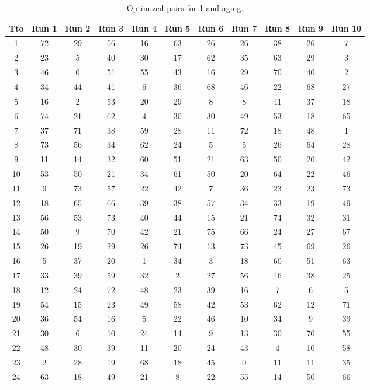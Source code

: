 \begin{table}
  \centering
  \scriptsize
  \caption{Optimized pairs for 1 and aging.}
  \label{tab_pairs}
\begin{tabular}{c c c c c c c c c c c }
\hline
Tto & Run 1 & Run 2 & Run 3 & Run 4 & Run 5 & Run 6 & Run 7 & Run 8 & Run 9 & Run 10 \\
\hline
1 & 72 & 29 & 56 & 16 & 63 & 26 & 26 & 38 & 26 & 7 \\
2 & 23 & 5 & 40 & 30 & 17 & 62 & 35 & 63 & 29 & 3 \\
3 & 46 & 0 & 51 & 55 & 43 & 16 & 29 & 70 & 40 & 2 \\
4 & 34 & 44 & 41 & 6 & 36 & 68 & 46 & 22 & 68 & 27 \\
5 & 16 & 2 & 53 & 20 & 29 & 8 & 8 & 41 & 37 & 18 \\
6 & 74 & 21 & 62 & 4 & 30 & 30 & 49 & 53 & 18 & 65 \\
7 & 37 & 71 & 38 & 59 & 28 & 11 & 72 & 18 & 48 & 1 \\
8 & 73 & 56 & 34 & 62 & 24 & 5 & 5 & 26 & 64 & 28 \\
9 & 11 & 14 & 32 & 60 & 51 & 21 & 63 & 50 & 20 & 42 \\
10 & 53 & 50 & 21 & 34 & 61 & 50 & 20 & 64 & 22 & 46 \\
11 & 9 & 73 & 57 & 22 & 42 & 7 & 36 & 23 & 23 & 73 \\
12 & 18 & 65 & 66 & 39 & 38 & 57 & 34 & 33 & 19 & 49 \\
13 & 56 & 53 & 73 & 40 & 44 & 15 & 21 & 74 & 32 & 31 \\
14 & 50 & 9 & 70 & 42 & 21 & 75 & 66 & 24 & 27 & 67 \\
15 & 26 & 19 & 29 & 26 & 74 & 13 & 73 & 45 & 69 & 26 \\
16 & 5 & 37 & 20 & 1 & 34 & 3 & 18 & 60 & 51 & 63 \\
17 & 33 & 39 & 59 & 32 & 2 & 27 & 56 & 46 & 38 & 25 \\
18 & 12 & 24 & 72 & 48 & 23 & 39 & 16 & 7 & 6 & 5 \\
19 & 54 & 15 & 23 & 49 & 58 & 42 & 53 & 62 & 12 & 71 \\
20 & 36 & 54 & 16 & 5 & 22 & 46 & 10 & 34 & 9 & 39 \\
21 & 30 & 6 & 10 & 24 & 14 & 9 & 13 & 30 & 70 & 55 \\
22 & 48 & 30 & 39 & 11 & 20 & 24 & 43 & 4 & 10 & 58 \\
23 & 2 & 28 & 19 & 68 & 18 & 45 & 0 & 11 & 11 & 35 \\
24 & 63 & 18 & 49 & 21 & 8 & 22 & 55 & 14 & 50 & 66 \\

\end{tabular}
\end{table}
